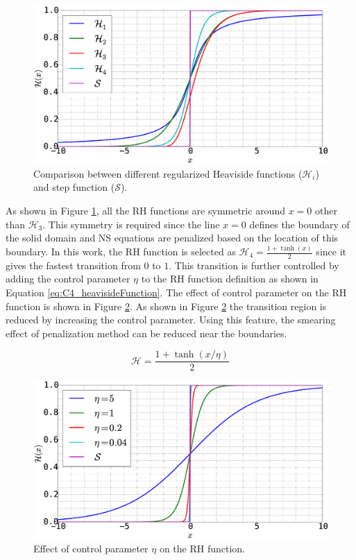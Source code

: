 \begin{figure}[H]
	\centering
	\includegraphics[width=12.00cm]{Chapter_4/figure/heaviside_function_example.eps}
	\caption{Comparison between different regularized Heaviside functions ($\mathcal{H}_i$) and step function ($\mathcal{S}$).}
	\label{fig:C4_heavisideFunctionExample}
\end{figure}

As shown in Figure \ref{fig:C4_heavisideFunctionExample}, all the RH functions are symmetric around $x = 0$ other than $\mathcal{H}_3$. This symmetry is required since the line $x = 0$ defines the boundary of the solid domain and NS equations are penalized based on the location of this boundary. In this work, the RH function is selected as $\mathcal{H}_4 = \frac{1 + \tanh(x)}{2}$ since it gives the fastest transition from $0$ to $1$. This transition is further controlled by adding the control parameter $\eta$ to the RH function definition as shown in Equation \eqref{eq:C4_heavisideFunction}. The effect of control parameter on the RH function is shown in Figure \ref{fig:C4_heavisideFunctionWithControlParamter}. As shown in Figure \ref{fig:C4_heavisideFunctionWithControlParamter} the transition region is reduced by increasing the control parameter. Using this feature, the smearing effect of penalization method can be reduced near the boundaries.

\begin{equation}\label{eq:C4_heavisideFunction}
	\mathcal{H} = \frac{1 + \tanh(x / \eta)}{2}
\end{equation}

\begin{figure}[H]
	\centering
	\includegraphics[width=12.00cm]{Chapter_4/figure/heaviside_function_with_control.eps}
	\caption{Effect of control parameter $\eta$ on the RH function.}
	\label{fig:C4_heavisideFunctionWithControlParamter}
\end{figure}

